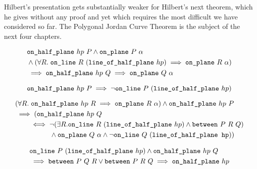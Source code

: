 Hilbert's presentation gets substantially weaker for Hilbert's next theorem, which he gives without any proof and yet which requires the most difficult we have considered so far. The Polygonal Jordan Curve Theorem is the subject of the next four chapters.

\begin{equation}\label{eq:halfPlaneOnPlane}
  \begin{split}
    &\texttt{on\_half\_plane}\ hp\ P \wedge \texttt{on\_plane}\ P\ \alpha \\
    &\wedge (\forall R.\;\texttt{on\_line}\ R\ (\texttt{line\_of\_half\_plane}\ hp) \implies \texttt{on\_plane}\ R\ \alpha) \\
    &\implies \texttt{on\_half\_plane}\ hp\ Q \implies \texttt{on\_plane}\ Q\ \alpha
  \end{split}
\end{equation}

\begin{equation}\label{eq:halfPlaneNotOnLine}
  \texttt{on\_half\_plane}\ hp\ P \implies \neg\texttt{on\_line}\ P\ (\texttt{line\_of\_half\_plane}\ hp)
\end{equation}

\begin{equation}\label{eq:onHalfPlaneNotBet}
  \begin{split}
    &(\forall R.\; \texttt{on\_half\_plane}\ hp\ R \implies \texttt{on\_plane}\ R\ \alpha) \wedge \texttt{on\_half\_plane}\ hp\ P\\
    &\implies (\texttt{on\_half\_plane}\ hp\ Q\\
    &\qquad \iff \neg(\exists R. \texttt{on\_line}\ R\ (\texttt{line\_of\_half\_plane}\ hp) \wedge \texttt{between}\ P\ R\ Q)\\
    &\qquad\qquad\quad \wedge \texttt{on\_plane}\ Q\ \alpha \wedge \neg\texttt{on\_line}\ Q\ (\texttt{line\_of\_half\_plane hp}))
  \end{split}
\end{equation}

\begin{equation}\label{eq:betOnHalfPlane1}
  \begin{split}
    &\texttt{on\_line}\ P\ (\texttt{line\_of\_half\_plane}\ hp) \wedge \texttt{on\_half\_plane}\ hp\ Q\\
    &\implies \texttt{between}\ P\ Q\ R \vee \texttt{between}\ P\ R\ Q \implies \texttt{on\_half\_plane}\ hp
  \end{split}
\end{equation}

